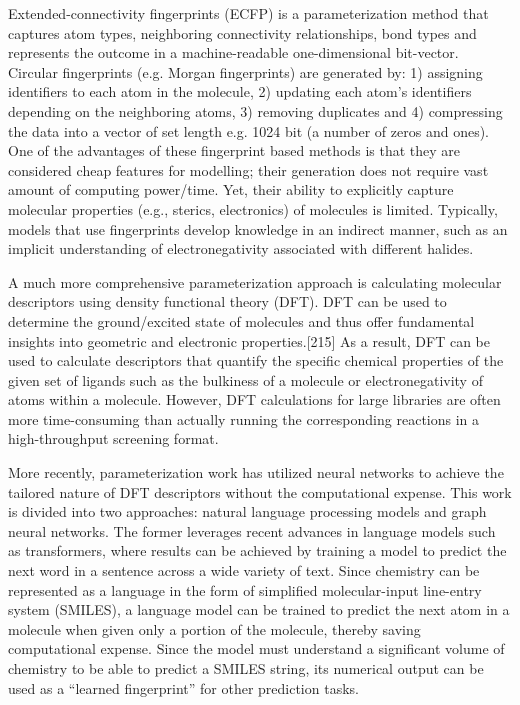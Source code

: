 Extended-connectivity fingerprints (ECFP) is a parameterization method that captures atom types, neighboring connectivity relationships, bond types and represents the outcome in a machine-readable one-dimensional bit-vector.\cite{Rogers2010} Circular fingerprints (e.g. Morgan fingerprints) are generated by: 1) assigning identifiers to each atom in the molecule, 2) updating each atom’s identifiers depending on the neighboring atoms, 3) removing duplicates and 4) compressing the data into a vector of set length e.g. 1024 bit (a number of zeros and ones). One of the advantages of these fingerprint based methods is that they are considered cheap features for modelling; their generation does not require vast amount of computing power/time. Yet, their ability to explicitly capture molecular properties (e.g., sterics, electronics) of molecules is limited. Typically, models that use fingerprints develop knowledge in an indirect manner, such as an implicit understanding of electronegativity associated with different halides.\cite{Eyke2020}

A much more comprehensive parameterization approach is calculating molecular descriptors using density functional theory (DFT). DFT can be used to determine the ground/excited state of molecules and thus offer fundamental insights into geometric and electronic properties.[215] As a result, DFT can be used to calculate descriptors that quantify the specific chemical properties of the given set of ligands such as the bulkiness of a molecule or electronegativity of atoms within a molecule. However, DFT calculations for large libraries are often more time-consuming than actually running the corresponding reactions in a high-throughput screening format.

More recently, parameterization work has utilized neural networks to achieve the tailored nature of DFT descriptors without the computational expense. This work is divided into two approaches: natural language processing models and graph neural networks. The former leverages recent advances in language models such as transformers,\cite{Vaswani2017} where results can be achieved by training a model to predict the next word in a sentence across a wide variety of text. Since chemistry can be represented as a language in the form of simplified molecular-input line-entry system (SMILES),\cite{Weininger1988} a language model can be trained to predict the next atom in a molecule when given only a portion of the molecule, thereby saving computational expense.\cite{Schwaller2019} Since the model must understand a significant volume of chemistry to be able to predict a SMILES string, its numerical output can be used as a “learned fingerprint” for other prediction tasks.\cite{Schwaller2021}

